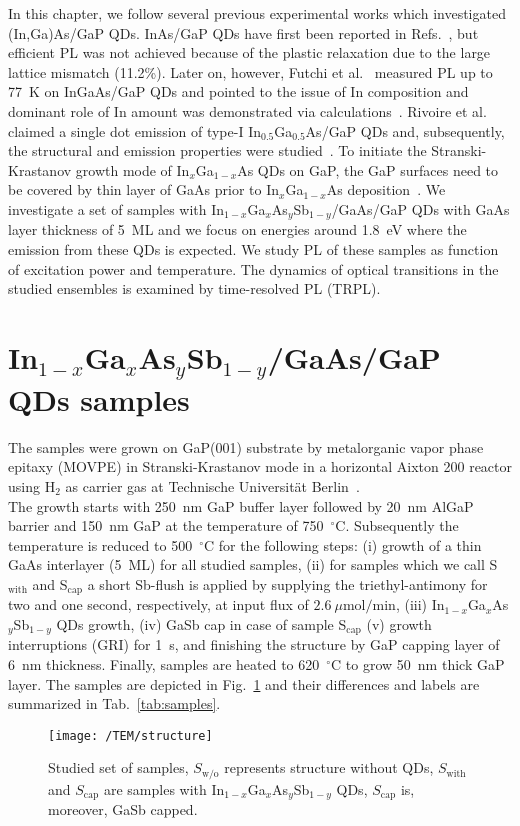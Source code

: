 In this chapter, we follow several previous experimental works which investigated {(In,Ga)As/GaP} QDs. InAs/GaP QDs have first been reported in Refs.~\citep{Leon_apl1998, guo_solidi2009}, but efficient PL was not achieved because of the plastic relaxation due to the large lattice mismatch (11.2\%). Later on, however, Futchi et al.~\citep{Fuchi_physicaE2004} measured PL up to 77~K on InGaAs/GaP QDs and pointed to the issue of In composition and dominant role of In amount was demonstrated via calculations~\citep{Fukami_solodi2011}. Rivoire et al.~\citep{Rivoire_prb2012} claimed a single dot emission of type-I In$_{0.5}$Ga$_{0.5}$As/GaP QDs and, subsequently, the structural and emission properties were studied~\cite{Stracke_apl2014, Sala_apl2016}. To initiate the Stranski-Krastanov growth mode of In$_x$Ga$_{1-x}$As QDs on GaP, the GaP surfaces need to be covered by thin layer of GaAs prior to In$_x$Ga$_{1-x}$As deposition~\citep{stracke_apl2012_qdflash_GaP}.
%
%
%
%
We investigate a set of samples with In$_{1-x}$Ga$_{x}$As$_y$Sb$_{1-y}$/GaAs/GaP QDs with GaAs layer thickness of 5~ML and we focus on energies around 1.8~eV where the emission from these QDs is expected. We study PL of these samples as function of excitation power and temperature. The dynamics of optical transitions in the studied ensembles is examined by time-resolved PL (TRPL).


\section{In$_{1-x}$Ga$_{x}$As$_y$Sb$_{1-y}$/GaAs/GaP QDs samples}
The samples were grown on GaP(001) substrate by metalorganic vapor phase epitaxy (MOVPE) in Stranski-Krastanov mode in a horizontal Aixton 200 reactor using H$_2$ as carrier gas at Technische Universität Berlin~\citep{Sala_apl2016}. \\
%
\indent The growth starts with 250~nm GaP buffer layer followed by 20~nm AlGaP barrier and 150~nm GaP at the temperature of 750~$^\circ$C. Subsequently the temperature is reduced to 500~$^\circ$C for the following steps: (i) growth of a thin GaAs interlayer (5~ML) for all studied samples, (ii) for samples which we call S$_\mathrm{with}$ and S$_\mathrm{cap}$ a short Sb-flush is applied by supplying the triethyl-antimony for two and one second, respectively, at input flux of $2.6~\mu\mathrm{mol/min}$, (iii) In$_{1-x}$Ga$_{x}$As$_y$Sb$_{1-y}$ QDs growth, (iv) GaSb cap in case of sample S$_\mathrm{cap}$ (v) growth interruptions (GRI) for 1~s, and finishing the structure by GaP capping layer of 6~nm thickness. Finally, samples are heated to 620~$^\circ$C to grow 50~nm thick GaP layer. The samples are depicted in Fig.~\ref{fig:TUstructure} and their differences and labels are summarized in Tab.~\ref{tab:samples}.
\begin{figure}
	\centering
	\texttt{[image: /TEM/structure]}
	\caption{Studied set of samples, $S_\mathrm{w/o}$ represents structure without QDs, $S_\mathrm{with}$ and $S_\mathrm{cap}$ are samples with In$_{1-x}$Ga$_{x}$As$_y$Sb$_{1-y}$ QDs, $S_\mathrm{cap}$ is, moreover, GaSb capped. }
	\label{fig:TUstructure}
\end{figure}

